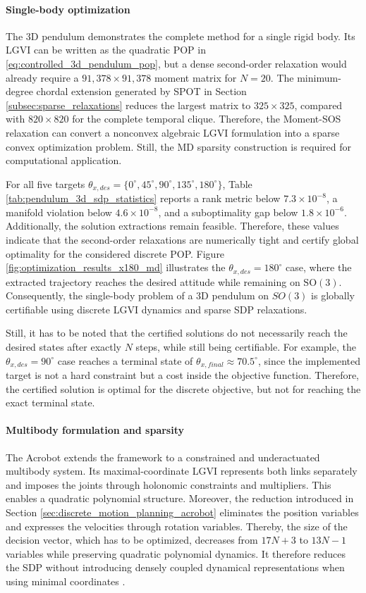 \paragraph{Single-body optimization}
The 3D pendulum demonstrates the complete method for a single rigid body.
Its LGVI can be written as the quadratic POP in \eqref{eq:controlled_3d_pendulum_pop},
but a dense second-order relaxation would already require a $91{,}378\times91{,}378$ 
moment matrix for $N=20$.
The minimum-degree chordal extension generated by SPOT in Section \ref{subsec:sparse_relaxations} 
reduces the largest matrix to $325\times325$,
compared with $820\times820$ for the complete temporal clique.
Therefore, the Moment-SOS relaxation can convert a nonconvex
algebraic LGVI formulation into a sparse convex optimization problem.
Still, the MD sparsity construction is required for computational application.

For all five targets $\theta_{x,des}=\{0^\circ, 45^\circ, 90^\circ, 135^\circ, 180^\circ\}$,
Table \ref{tab:pendulum_3d_sdp_statistics} reports a rank metric below $7.3\times10^{-8}$,
a manifold violation below $4.6\times10^{-8}$,
and a suboptimality gap below $1.8\times10^{-6}$.
Additionally, the solution extractions remain feasible.
Therefore, these values indicate that the second-order relaxations are numerically tight and
certify global optimality for the considered discrete POP.
Figure \ref{fig:optimization_results_x180_md} illustrates the $\theta_{x,des}=180^\circ$ case,
where the extracted trajectory reaches the desired attitude while remaining on $\mathrm{SO}(3)$.
Consequently, the single-body problem of a 3D pendulum on $SO(3)$ is globally certifiable 
using discrete LGVI dynamics and sparse SDP relaxations.

Still, it has to be noted that the certified solutions do not necessarily 
reach the desired states after exactly $N$ steps, while still being certifiable. For example,
the $\theta_{x,des}=90^\circ$ case reaches a terminal state of $\theta_{x,final}\approx70.5^\circ$,
since the implemented target is not a hard constraint but a cost inside the objective function.
Therefore, the certified solution is optimal for the discrete objective, 
but not for reaching the exact terminal state.

\paragraph{Multibody formulation and sparsity}
The Acrobot extends the framework to a constrained and underactuated multibody system.
Its maximal-coordinate LGVI represents both links separately
and imposes the joints through holonomic constraints and multipliers.
This enables a quadratic polynomial structure.
Moreover, the reduction introduced in Section \ref{sec:discrete_motion_planning_acrobot} eliminates 
the position variables and expresses the velocities through rotation variables.
Thereby, the size of the decision vector, which has to be optimized, 
decreases from $17N+3$ to $13N-1$ variables while preserving quadratic polynomial dynamics.
It therefore reduces the SDP without introducing densely coupled dynamical 
representations when using minimal coordinates \cite{BrudigamManchester2021LQR}.

